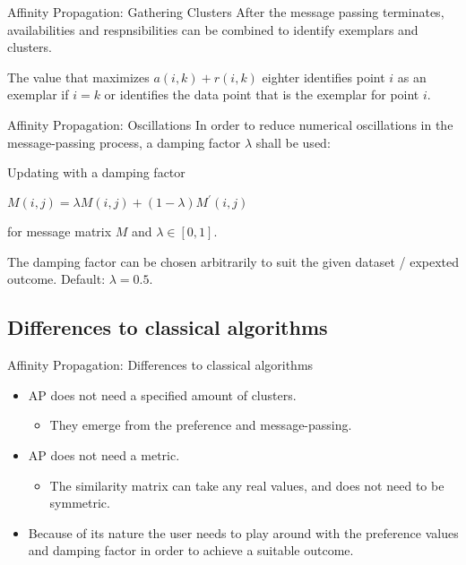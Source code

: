 \documentclass{beamer}
\begin{document}
\begin{frame}{Affinity Propagation: Gathering Clusters}
	After the message passing terminates, \alert{availabilities} and \alert{respnsibilities} can be combined to identify \alert{exemplars} and clusters.
	
	The value that maximizes $a(i,k) + r(i,k)$ eighter identifies point $i$ as an \alert{exemplar} if $i=k$ or identifies the data point that is the \alert{exemplar} for point $i$.
\end{frame}
\begin{frame}{Affinity Propagation: Oscillations}
	In order to reduce numerical oscillations in the message-passing process, a damping factor $\lambda$ shall be used:
	\begin{block}{Updating with a damping factor}
		\begin{center}
			$M(i,j) =\lambda M(i,j) + (1-\lambda) M^\prime (i,j)$
		\end{center}
	\end{block}
	 for message matrix $M$ and $\lambda\in\left[ 0,1\right]$.
	
	The damping factor can be chosen arbitrarily to suit the given dataset / expexted outcome. Default: $\lambda = 0.5$.
\end{frame}

\subsection{Differences to classical algorithms}
\begin{frame}{Affinity Propagation: Differences to classical algorithms}
	\begin{itemize}
		\item AP does not need a specified amount of clusters.
		\begin{itemize}
			\item They emerge from the preference and message-passing.
		\end{itemize}
		\item AP does not need a metric.
		\begin{itemize}
			\item The \alert{similarity matrix} can take any real values, and does not need to be symmetric.
		\end{itemize}
		\item Because of its nature the user needs to play around with the \alert{preference values} and \alert{damping factor} in order to achieve a suitable outcome.
	\end{itemize}
\end{frame}
\end{document}
